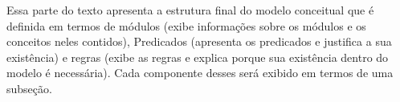 Essa parte do texto apresenta a estrutura final do modelo conceitual que é definida em termos de módulos (exibe informações sobre os módulos e os conceitos neles contidos), Predicados (apresenta os predicados e justifica a sua existência) e regras (exibe as regras e explica porque sua existência dentro do modelo é necessária). Cada componente desses será exibido em termos de uma subseção. 